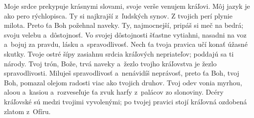Moje srdce prekypuje krásnymi slovami,
svoje verše venujem kráľovi.
\versseparator
Môj jazyk je ako pero rýchlopisca.
\versseparator
Ty si najkrajší z~ľudských synov.
Z tvojich perí plynie milota.
Preto ťa Boh požehnal naveky.
\versseparator
Ty, najmocnejší, pripáš si meč na bedrá;
\versseparator
svoju velebu a~dôstojnosť.
Vo svojej dôstojnosti šťastne vytiahni, nasadni na voz
\versseparator
a~bojuj za pravdu, lásku a~spravodlivosť.
Nech ťa tvoja pravica učí konať úžasné skutky.
\versseparator
Tvoje ostré šípy
zasiahnu srdcia kráľových nepriateľov;
poddajú sa ti národy.
\versseparator
Tvoj trón, Bože, trvá naveky
a~žezlo tvojho kráľovstva je žezlo spravodlivosti.
\versseparator
Miluješ spravodlivosť a~nenávidíš neprávosť,
preto ťa Boh, tvoj Boh, pomazal
olejom radosti viac ako tvojich druhov.
\versseparator
Tvoj odev vonia myrhou, aloou a~kasiou
a~rozveseľuje ťa zvuk harfy z~palácov zo slonoviny.
Dcéry kráľovské sú medzi tvojimi vyvolenými;
\versseparator
po tvojej pravici stojí kráľovná ozdobená zlatom z~Ofíru. 